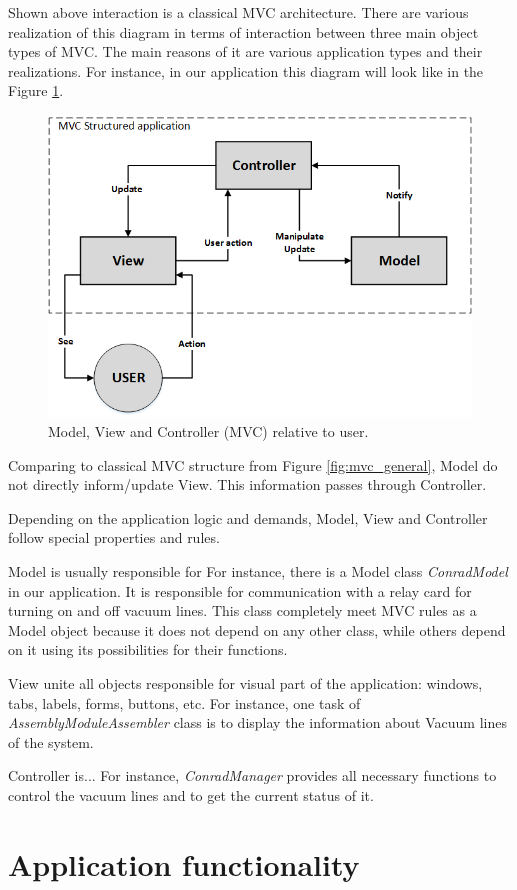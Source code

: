 Shown above interaction is a classical MVC architecture. There are various realization of this diagram in terms of interaction between three main object types of MVC. The main reasons of it are various application types and their realizations. For instance, in our application this diagram will look like in the Figure \ref{fig:mvc_custom}.

\begin{figure}[ht]\centering
\includegraphics[width=0.7\linewidth]{Data/Control_Software/MVC_custom.png}
\caption{Model, View and Controller (MVC) relative to user.}
\label{fig:mvc_custom}
\end{figure}

Comparing to classical MVC structure from Figure \ref{fig:mvc_general}, Model do not directly inform/update View. This information passes through Controller.

Depending on the application logic and demands, Model, View and Controller follow special properties and rules.

Model is usually responsible for For instance, there is a Model class \textit{ConradModel} in our application. It is responsible for communication with a relay card for turning on and off vacuum lines. This class completely meet MVC rules as a Model object because it does not depend on any other class, while others depend on it using its possibilities for their functions.

View unite all objects responsible for visual part of the application: windows, tabs, labels, forms, buttons, etc. For instance, one task of \textit{AssemblyModuleAssembler} class is to display the information about Vacuum lines of the system.

Controller  is... For instance, \textit{ConradManager} provides all necessary functions to control the vacuum lines and to get the current status of it.

\section{Application functionality}

